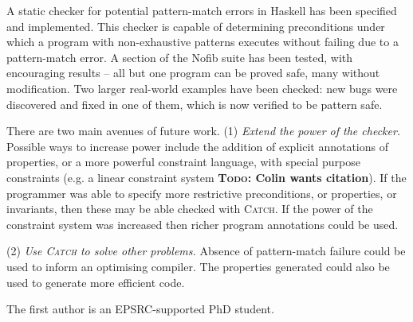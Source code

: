 \documentclass[preprint]{sigplanconf}
\newcommand{\catch}{\textsc{Catch}}
\newcommand{\todo}[1]{\textbf{\textsc{Todo:} #1}}
\newenvironment{discuss}
    {\noindent\hspace{-1.5mm}\vline\hspace{1mm}\vline\hspace{1mm}\begin{minipage}[h]{\linewidth}}
    {\end{minipage}}
\begin{document}
\begin{discuss}
A static checker for potential pattern-match errors in Haskell has been specified and implemented. This checker is capable of determining preconditions under which a program with non-exhaustive patterns executes without failing due to a pattern-match error. A section of the Nofib suite has been tested, with encouraging results -- all but one program can be proved safe, many without modification. Two larger real-world examples have been checked: new bugs were discovered and fixed in one of them, which is now verified to be pattern safe.

There are two main avenues of future work. (1) \textit{Extend the power of the checker.} Possible ways to increase power include the addition of explicit annotations of properties, or a more powerful constraint language, with special purpose constraints (e.g. a linear constraint system \todo{Colin wants citation}). If the programmer was able to specify more restrictive preconditions, or properties, or invariants, then these may be able checked with \catch{}. If the power of the constraint system was increased then richer program annotations could be used.

(2) \textit{Use \catch{} to solve other problems.} Absence of pattern-match failure could be used to inform an optimising compiler. The properties generated could also be used to generate more efficient code.
\end{discuss}

%

\acks

The first author is an EPSRC-supported PhD student.



\small

\end{document}
